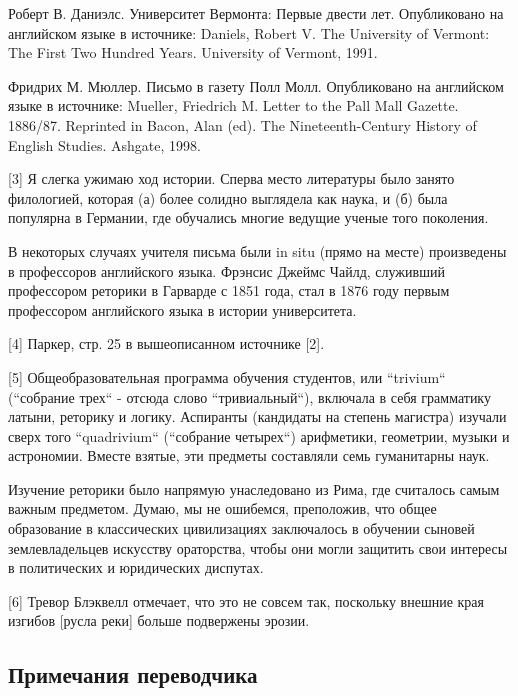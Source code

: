 \documentclass[ebook,12pt,oneside,openany]{memoir}
\begin{document}
Роберт В. Даниэлс. Университет Вермонта: Первые двести лет.
Опубликовано на английском языке в источнике: Daniels, Robert V. The
University of Vermont: The First Two Hundred Years. University of
Vermont, 1991. \newline

Фридрих М. Мюллер. Письмо в газету Полл Молл. Опубликовано на
английском языке в источнике: Mueller, Friedrich M. Letter to the Pall
Mall Gazette. 1886/87. Reprinted in Bacon, Alan (ed). The
Nineteenth-Century History of English Studies. Ashgate, 1998. \newline

[3] Я слегка ужимаю ход истории. Сперва место литературы было занято
филологией, которая (а) более солидно выглядела как наука, и (б) была
популярна в Германии, где обучались многие ведущие ученые того
поколения. \newline

В некоторых случаях учителя письма были in situ (прямо на месте)
произведены в профессоров английского языка. Фрэнсис Джеймс Чайлд,
служивший профессором реторики в Гарварде с 1851 года, стал в 1876
году первым профессором английского языка в истории университета.
\newline

[4] Паркер, стр. 25 в вышеописанном источнике [2]. \newline

[5] Общеобразовательная программа обучения студентов, или ``trivium``
(``собрание трех`` - отсюда слово ``тривиальный``), включала в себя
грамматику латыни, реторику и логику. Аспиранты (кандидаты на степень
магистра) изучали сверх того ``quadrivium`` (``собрание четырех``)
арифметики, геометрии, музыки и астрономии. Вместе взятые, эти
предметы составляли семь гуманитарны наук. \newline

Изучение реторики было напрямую унаследовано из Рима, где считалось
самым важным предметом. Думаю, мы не ошибемся, преположив, что общее
образование в классических цивилизациях заключалось в обучении сыновей
землевладельцев искусству ораторства, чтобы они могли защитить свои
интересы в политических и юридических диспутах. \newline

[6] Тревор Блэквелл отмечает, что это не совсем так, поскольку внешние
края изгибов [русла реки] больше подвержены эрозии. \newline

\subsection{Примечания переводчика}
\end{document}
